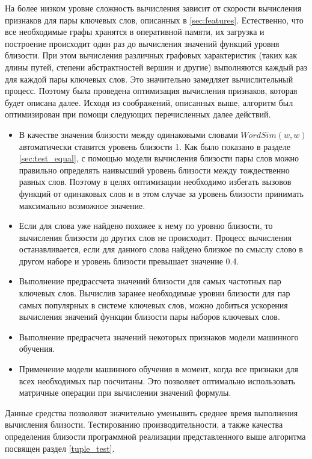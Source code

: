 На более низком уровне сложность вычисления зависит от скорости вычисления признаков для пары ключевых слов, описанных в \ref{sec:features}. Естественно, что все необходимые графы хранятся в оперативной памяти, их загрузка и построение происходит один раз до вычисления значений функций уровня близости. При этом вычисления различных графовых характеристик (таких как длины путей, степени абстрактностей вершин и другие) выполняются каждый раз для каждой пары ключевых слов. Это значительно замедляет вычислительный процесс. Поэтому была проведена оптимизация вычисления признаков, которая будет описана далее. Исходя из соображений, описанных выше, алгоритм был оптимизирован при помощи следующих перечисленных далее действий.
\begin{itemize}
    \item В качестве значения близости между одинаковыми словами $WordSim(w, w)$ автоматически ставится уровень близости 1. Как было показано в разделе \ref{sec:test_equal}, с помощью модели вычисления близости пары слов можно правильно определять наивысший уровень близости между тождественно равных слов. Поэтому в целях оптимизации необходимо избегать вызовов функций от одинаковых слов и в этом случае за уровень близости принимать максимально возможное значение.
    \item Если для слова уже найдено похожее к нему по уровню близости, то вычисления близости до других слов не происходит. Процесс вычисления останавливается, если для данного слова найдено близкое по смыслу слово в другом наборе и уровень близости превышает значение 0.4.
    \item Выполнение предрассчета значений близости для самых частотных пар ключевых слов. Вычислив заранее необходимые уровни близости для пар самых популярных в системе ключевых слов, можно добиться ускорения вычисления значений функции близости пары наборов ключевых слов.
    \item Выполнение предрасчета значений некоторых признаков модели машинного обучения. 
    \item Применение модели машинного обучения в момент, когда все признаки для всех необходимых пар посчитаны. Это позволяет оптимально использовать матричные операции при вычислении значений формулы.
\end{itemize}

Данные средства позволяют значительно уменьшить среднее время выполнения вычисления близости. Тестированию производительности, а также качества определения близости программной реализации представленного выше алгоритма посвящен раздел \ref{tuple_test}. 

